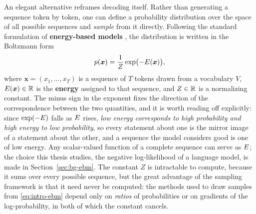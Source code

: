 An elegant alternative reframes decoding itself. Rather than generating a sequence token by token, one can define a probability distribution over the space of all possible sequences and \emph{sample} from it directly. Following the standard formulation of \textbf{energy-based models} \citep{lecun2006tutorial, hinton2002training}, the distribution is written in the Boltzmann form
\begin{equation}
    p(\bm{x}) = \frac{1}{Z}\exp\bigl(-E(\bm{x})\bigr),
    \label{eq:intro-ebm}
\end{equation}
where $\bm{x} = (x_1, \dots, x_T)$ is a sequence of $T$ tokens drawn from a vocabulary $V$, $E(\bm{x}) \in \mathbb{R}$ is the \textbf{energy} assigned to that sequence, and $Z \in \mathbb{R}$ is a normalizing constant. The minus sign in the exponent fixes the direction of the correspondence between the two quantities, and it is worth reading off explicitly: since $\exp(-E)$ falls as $E$ rises, \emph{low energy corresponds to high probability and high energy to low probability}, so every statement about one is the mirror image of a statement about the other, and a sequence the model considers good is one of low energy. Any scalar-valued function of a complete sequence can serve as $E$; the choice this thesis studies, the negative log-likelihood of a language model, is made in Section~\ref{sec:bg-ebm}. The constant $Z$ is intractable to compute, because it sums over every possible sequence, but the great advantage of the sampling framework is that it need never be computed: the methods used to draw samples from \eqref{eq:intro-ebm} depend only on \emph{ratios} of probabilities or on gradients of the log-probability, in both of which the constant cancels.


